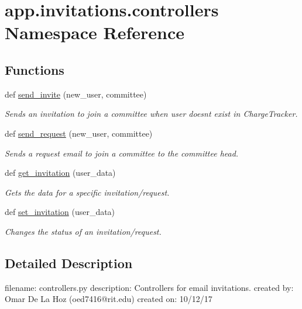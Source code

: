 \hypertarget{namespaceapp_1_1invitations_1_1controllers}{}\section{app.\+invitations.\+controllers Namespace Reference}
\label{namespaceapp_1_1invitations_1_1controllers}
\subsection*{Functions}
\begin{DoxyCompactItemize}
\item 
def \mbox{\hyperlink{namespaceapp_1_1invitations_1_1controllers_ac9d6b41452741ffa83fd04f7f935dd4b}{send\+\_\+invite}} (new\+\_\+user, committee)
\begin{DoxyCompactList}\small\item\em Sends an invitation to join a committee when user doesn\textquotesingle{}t exist in Charge\+Tracker. \end{DoxyCompactList}\item 
def \mbox{\hyperlink{namespaceapp_1_1invitations_1_1controllers_a41239d3a243861515a5a14599333ad0e}{send\+\_\+request}} (new\+\_\+user, committee)
\begin{DoxyCompactList}\small\item\em Sends a request email to join a committee to the committee head. \end{DoxyCompactList}\item 
def \mbox{\hyperlink{namespaceapp_1_1invitations_1_1controllers_aec05f77e1fcf926dfc05239d1272e3e3}{get\+\_\+invitation}} (user\+\_\+data)
\begin{DoxyCompactList}\small\item\em Gets the data for a specific invitation/request. \end{DoxyCompactList}\item 
def \mbox{\hyperlink{namespaceapp_1_1invitations_1_1controllers_a5bc2456a1f82dd8c9c0942dfdfbda935}{set\+\_\+invitation}} (user\+\_\+data)
\begin{DoxyCompactList}\small\item\em Changes the status of an invitation/request. \end{DoxyCompactList}\end{DoxyCompactItemize}


\subsection{Detailed Description}
\begin{DoxyVerb}filename: controllers.py
description: Controllers for email invitations.
created by: Omar De La Hoz (oed7416@rit.edu)
created on: 10/12/17
\end{DoxyVerb}
 

